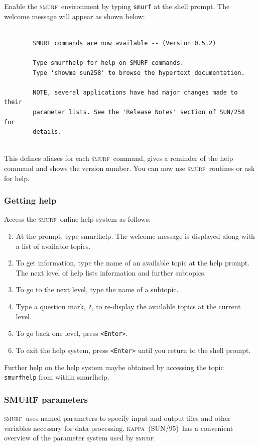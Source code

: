\documentclass[twoside,11pt]{article}
\newcommand{\xref}[3]{#1}
\renewcommand{\_}{\texttt{\symbol{95}}}
\newcommand{\KAPPA}{\textsc{kappa}}
\newcommand{\KAPPAref}{\xref{(SUN/95)}{sun95}{}}
\newcommand{\SMURF}{\textsc{smurf}}
\newcommand{\task}[1]{\textsf{#1}}
\newcommand{\smurfhelp}{\xref{\task{smurfhelp}}{sun258}{SMURFHELP}}
\begin{document}
Enable the \SMURF\ environment by typing \verb+smurf+ at the shell
prompt. The welcome message will appear as shown below:
\begin{verbatim}

        SMURF commands are now available -- (Version 0.5.2)

        Type smurfhelp for help on SMURF commands.
        Type 'showme sun258' to browse the hypertext documentation.

        NOTE, several applications have had major changes made to their
        parameter lists. See the 'Release Notes' section of SUN/258 for
        details.


\end{verbatim}
This defines aliases for each \SMURF\ command, gives a reminder of the
help command and shows the version number. You can now use \SMURF\
routines or ask for help.

\subsubsection{Getting help}

Access the \SMURF\ online help system as follows:
\begin{enumerate}
\item At the prompt, type \smurfhelp. The welcome message is
  displayed along with a list of available topics.
\item To get information, type the name of an available topic at the
  help prompt.  The next level of help lists information and further
  subtopics.
\item To go to the next level, type the name of a subtopic.
\item Type a question mark, \verb+?+, to re-display the available
  topics at the current level.
\item To go back one level, press \verb+<Enter>+.
\item To exit the help system, press \verb+<Enter>+ until you return
  to the shell prompt.
\end{enumerate}
Further help on the help system maybe obtained by accessing the topic
\verb+smurfhelp+ from within \smurfhelp.

\subsubsection{SMURF parameters}

\SMURF\ uses named parameters to specify input and output files and
other variables necessary for data processing. \KAPPA\ \KAPPAref\ has a
convenient overview of the parameter system used by \SMURF.
\end{document}
